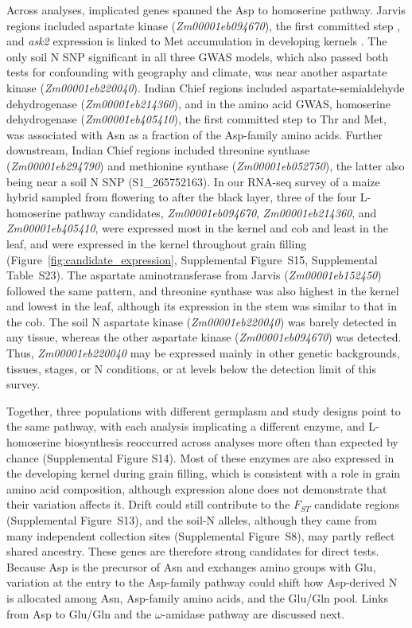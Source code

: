 \documentclass[namedate,unnumsec,webpdf,contemporary,large]{oup-authoring-template}
\begin{document}
Across analyses, implicated genes spanned the Asp to homoserine pathway. Jarvis regions included aspartate kinase (\textit{Zm00001eb094670}), the first committed step \citep{Viola2001AspartatePathway}, and \textit{ask2} expression is linked to Met accumulation in developing kernels \citep{Duo2026Ask2}. The only soil N SNP significant in all three GWAS models, which also passed both tests for confounding with geography and climate, was near another aspartate kinase (\textit{Zm00001eb220040}). Indian Chief regions included aspartate-semialdehyde dehydrogenase (\textit{Zm00001eb214360}), and in the amino acid GWAS, homoserine dehydrogenase (\textit{Zm00001eb405410}), the first committed step to Thr and Met, was associated with Asn as a fraction of the Asp-family amino acids. Further downstream, Indian Chief regions included threonine synthase (\textit{Zm00001eb294790}) and methionine synthase (\textit{Zm00001eb052750}), the latter also being near a soil N SNP (S1\_265752163). In our RNA-seq survey of a maize hybrid sampled from flowering to after the black layer, three of the four L-homoserine pathway candidates, \textit{Zm00001eb094670}, \textit{Zm00001eb214360}, and \textit{Zm00001eb405410}, were expressed most in the kernel and cob and least in the leaf, and were expressed in the kernel throughout grain filling (Figure~\ref{fig:candidate_expression}, Supplemental Figure~S15, Supplemental Table~S23). The aspartate aminotransferase from Jarvis (\textit{Zm00001eb152450}) followed the same pattern, and threonine synthase was also highest in the kernel and lowest in the leaf, although its expression in the stem was similar to that in the cob. The soil N aspartate kinase (\textit{Zm00001eb220040}) was barely detected in any tissue, whereas the other aspartate kinase (\textit{Zm00001eb094670}) was detected. Thus, \textit{Zm00001eb220040} may be expressed mainly in other genetic backgrounds, tissues, stages, or N conditions, or at levels below the detection limit of this survey.

Together, three populations with different germplasm and study designs point to the same pathway, with each analysis implicating a different enzyme, and L-homoserine biosynthesis reoccurred across analyses more often than expected by chance (Supplemental Figure S14). Most of these enzymes are also expressed in the developing kernel during grain filling, which is consistent with a role in grain amino acid composition, although expression alone does not demonstrate that their variation affects it. Drift could still contribute to the $F_{ST}$ candidate regions (Supplemental Figure~S13), and the soil-N alleles, although they came from many independent collection sites (Supplemental Figure~S8), may partly reflect shared ancestry. These genes are therefore strong candidates for direct tests. Because Asp is the precursor of Asn and exchanges amino groups with Glu, variation at the entry to the Asp-family pathway could shift how Asp-derived N is allocated among Asn, Asp-family amino acids, and the Glu/Gln pool. Links from Asp to Glu/Gln and the $\omega$-amidase pathway are discussed next.
\end{document}

